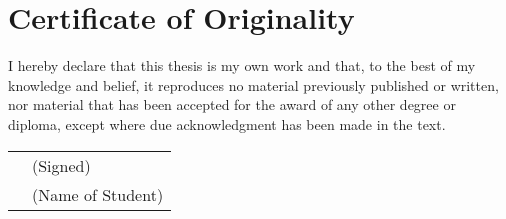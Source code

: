 \chapter*{Certificate of Originality}
\label{ch:certificate}

I hereby declare that this thesis is my own work and that, to the best
of my knowledge and belief, it reproduces no material previously
published or written, nor material that has been accepted for the award
of any other degree or diploma, except where due acknowledgment has
been made in the text.

\vfill

\begin{flushright}
    \begingroup
        \renewcommand{\arraystretch}{1.5}
        \newcommand*{\hrulefilled}[1]{\hrulefill\vskip-1.8em\makebox[\linewidth]{\textit{#1}}}
        \begin{tabular}{p{.4\linewidth}l}
            \hrulefill                  & (Signed)\\
            \hrulefilled{\theauthor}    & (Name of Student)\\
        \end{tabular}
    \endgroup
\end{flushright}
